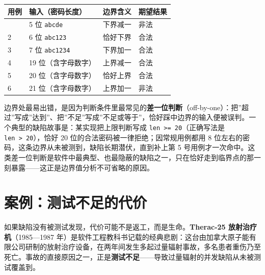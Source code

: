 \documentclass[
]{ctexbook}
\newcounter{none}
\begin{document}
{\def\LTcaptype{none} %
\begin{longtable}[]{@{}llll@{}}
\toprule\noalign{}
用例 & 输入（密码长度） & 边界含义 & 期望结果 \\
\midrule\noalign{}
\endhead
\bottomrule\noalign{}
\endlastfoot
1 & 5 位 \texttt{abcde} & 下界减一 & 非法 \\
2 & 6 位 \texttt{abc123} & 恰好下界 & 合法 \\
3 & 7 位 \texttt{abc1234} & 下界加一 & 合法 \\
4 & 19 位（含字母数字） & 上界减一 & 合法 \\
5 & 20 位（含字母数字） & 恰好上界 & 合法 \\
6 & 21 位（含字母数字） & 上界加一 & 非法 \\
\end{longtable}
}

边界处最易出错，是因为判断条件里最常见的\textbf{差一位判断}（off-by-one）：把''超过''写成''达到''、把''不足''写成''不足或等于''，恰好踩中边界的输入便被误判。一个典型的缺陷故事是：某实现把上限判断写成
\texttt{len\ \textgreater{}=\ 20}（正确写法是
\texttt{len\ \textgreater{}\ 20}），恰好 20
位的合法密码被一律拒绝；因常规用例都用 8
位左右的密码，这条边界从未被测到，缺陷长期潜伏，直到补上第 5
号用例才一次命中。这类差一位判断是软件中最典型、也最隐蔽的缺陷之一，只在恰好走到临界点的那一刻暴露------这正是边界值分析不可省略的原因。

\section{案例：测试不足的代价}\label{ux6848ux4f8bux6d4bux8bd5ux4e0dux8db3ux7684ux4ee3ux4ef7}

如果缺陷没有被测试发现，代价可能不是返工，而是生命。\textbf{Therac-25
放射治疗机}（1985---1987
年）是软件工程教科书记载的经典悲剧：这台由加拿大原子能有限公司研制的放射治疗设备，在两年间发生多起过量辐射事故，多名患者重伤乃至死亡。事故的直接原因之一，正是\textbf{测试不足}------导致过量辐射的并发缺陷从未被测试覆盖到。
\end{document}
